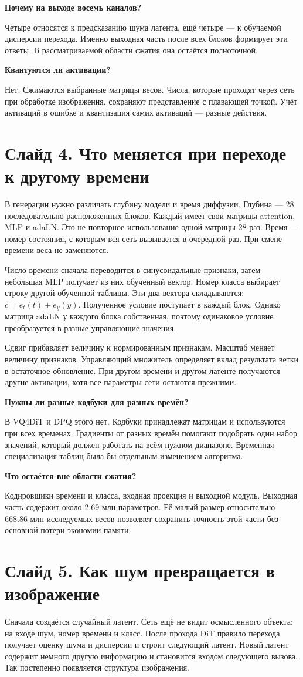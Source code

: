 \documentclass[a4paper,11pt]{article}
\newcommand{\slide}[2]{\clearpage\section*{Слайд #1. #2}}
\newcommand{\question}[1]{\par\textbf{#1}\par}
\begin{document}
\question{Почему на выходе восемь каналов?}
Четыре относятся к предсказанию шума латента, ещё четыре --- к обучаемой
дисперсии перехода. Именно выходная часть после всех блоков формирует
эти ответы. В рассматриваемой области сжатия она остаётся полноточной.

\question{Квантуются ли активации?}
Нет. Сжимаются выбранные матрицы весов. Числа, которые проходят через сеть
при обработке изображения, сохраняют представление с плавающей точкой.
Учёт активаций в ошибке и квантизация самих активаций --- разные действия.

\slide{4}{Что меняется при переходе к другому времени}
В генерации нужно различать глубину модели и время диффузии.
Глубина --- 28 последовательно расположенных блоков. Каждый имеет свои
матрицы attention, MLP и adaLN. Это не повторное использование одной
матрицы 28 раз. Время --- номер состояния, с которым вся сеть вызывается
в очередной раз. При смене времени веса не заменяются.

Число времени сначала переводится в синусоидальные признаки, затем
небольшая MLP получает из них обученный вектор. Номер класса выбирает
строку другой обученной таблицы. Эти два вектора складываются:
$c=e_t(t)+e_y(y)$. Полученное условие поступает в каждый блок.
Однако матрица adaLN у каждого блока собственная, поэтому одинаковое
условие преобразуется в разные управляющие значения.

Сдвиг прибавляет величину к нормированным признакам. Масштаб меняет
величину признаков. Управляющий множитель определяет вклад результата
ветки в остаточное обновление. При другом времени и другом латенте
получаются другие активации, хотя все параметры сети остаются прежними.

\question{Нужны ли разные кодбуки для разных времён?}
В VQ4DiT и DPQ этого нет. Кодбуки принадлежат матрицам и используются
при всех временах. Градиенты от разных времён помогают подобрать один
набор значений, который должен работать на всём нужном диапазоне.
Временная специализация таблиц была бы отдельным изменением алгоритма.

\question{Что остаётся вне области сжатия?}
Кодировщики времени и класса, входная проекция и выходной модуль.
Выходная часть содержит около 2.69 млн параметров. Её малый размер
относительно 668.86 млн исследуемых весов позволяет сохранить точность
этой части без основной потери экономии памяти.

\slide{5}{Как шум превращается в изображение}
Сначала создаётся случайный латент. Сеть ещё не видит осмысленного
объекта: на входе шум, номер времени и класс. После прохода DiT
правило перехода получает оценку шума и дисперсии и строит следующий
латент. Новый латент содержит немного другую информацию и становится
входом следующего вызова. Так постепенно появляется структура изображения.
\end{document}

